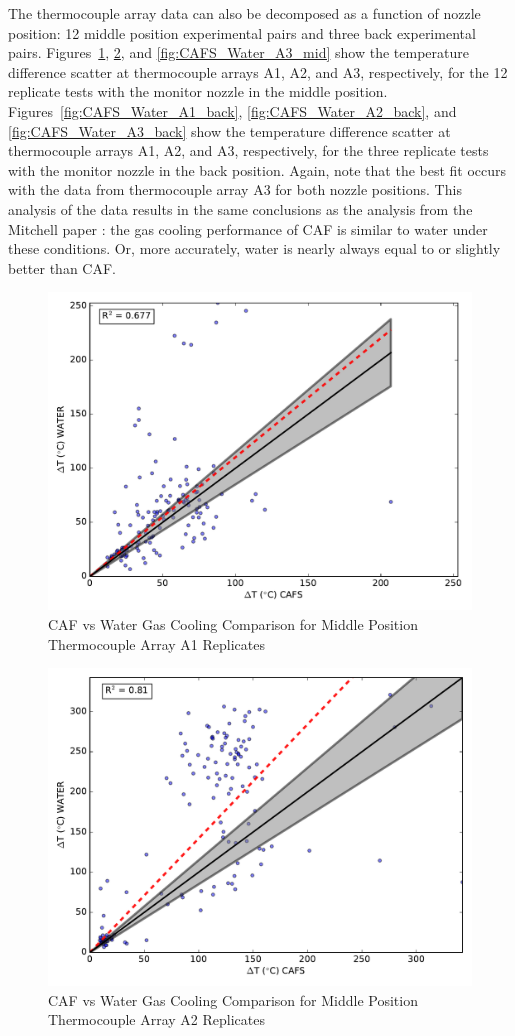 \documentclass[12pt,oneside]{book}
\begin{document}
\clearpage

The thermocouple array data can also be decomposed as a function of nozzle position: 12 middle position experimental pairs and three back experimental pairs. Figures~\ref{fig:CAFS_Water_A1_mid}, \ref{fig:CAFS_Water_A2_mid}, and \ref{fig:CAFS_Water_A3_mid} show the temperature difference scatter at thermocouple arrays A1, A2, and A3, respectively, for the 12 replicate tests with the monitor nozzle in the middle position. Figures~\ref{fig:CAFS_Water_A1_back}, \ref{fig:CAFS_Water_A2_back}, and \ref{fig:CAFS_Water_A3_back} show the temperature difference scatter at thermocouple arrays A1, A2, and A3, respectively, for the three replicate tests with the monitor nozzle in the back position. Again, note that the best fit occurs with the data from thermocouple array A3 for both nozzle positions. This analysis of the data results in the same conclusions as the analysis from the Mitchell paper \cite{Mitchell:1}: the gas cooling performance of CAF is similar to water under these conditions. Or, more accurately, water is nearly always equal to or slightly better than CAF.

\begin{figure}[!ht]
	\includegraphics[width=.7\columnwidth]{../Figures/Gas_Cooling/Combined_mid_A1_scatter}
	\caption{CAF vs Water Gas Cooling Comparison for Middle Position Thermocouple Array A1 Replicates}
	\label{fig:CAFS_Water_A1_mid}
\end{figure}

\begin{figure}[!ht]
	\includegraphics[width=.7\columnwidth]{../Figures/Gas_Cooling/Combined_mid_A2_scatter}
	\caption{CAF vs Water Gas Cooling Comparison for Middle Position Thermocouple Array A2 Replicates}
	\label{fig:CAFS_Water_A2_mid}
\end{figure}
\end{document}
